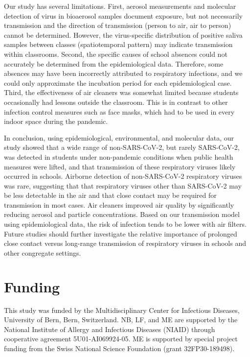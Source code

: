 \documentclass[fleqn,11pt]{wlscirep}
\begin{document}

Our study has several limitations. First, aerosol measurements and molecular detection of virus in bioaerosol samples document exposure, but not necessarily transmission and the direction of transmission (person to air, air to person) cannot be determined. However, the virus-specific distribution of positive saliva samples between classes (spatiotemporal pattern) may indicate transmission within classrooms. Second, the specific causes of school absences could not accurately be determined from the epidemiological data. Therefore, some absences may have been incorrectly attributed to respiratory infections, and we could only approximate the incubation period for each epidemiological case. Third, the effectiveness of air cleaners was somewhat limited because students occasionally had lessons outside the classroom. This is in contrast to other infection control measures such as face masks, which had to be used in every indoor space during the pandemic.


In conclusion, using epidemiological, environmental, and molecular data, our study showed that a wide range of non-SARS-CoV-2, but rarely SARS-CoV-2, was detected in students under non-pandemic conditions when public health measures were lifted, and that transmission of these respiratory viruses likely occurred in schools. Airborne detection of non-SARS-CoV-2 respiratory viruses was rare, suggesting that that respiratory viruses other than SARS-CoV-2 may be less detectable in the air and that close contact may be required for transmission in most cases. Air cleaners improved air quality by significantly reducing aerosol and particle concentrations. Based on our transmission model using epidemiological data, the risk of infection tends to be lower with air filters. Future studies should further investigate the relative importance of prolonged close contact versus long-range transmission of respiratory viruses in schools and other congregate settings.

\newpage


\section*{Funding}
This study was funded by the Multidisciplinary Center for Infectious Diseases, University of Bern, Bern, Switzerland. NB, LF, and ME are supported by the National Institute of Allergy and Infectious Diseases (NIAID) through cooperative agreement 5U01-AI069924-05. ME is supported by special project funding from the Swiss National Science Foundation (grant 32FP30-189498). \medskip
\end{document}
